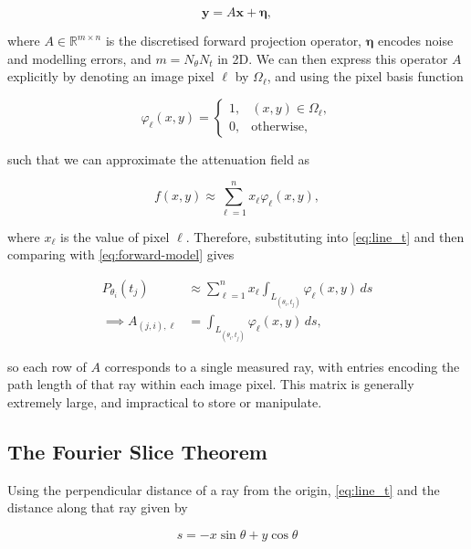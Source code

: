 \begin{equation}
\mathbf{y}=A\mathbf{x}+\boldsymbol{\eta},
\label{eq:forward-model}
\end{equation}

where $A\in \mathbb{R}^{m \times n}$ is the discretised forward projection operator, $\boldsymbol{\eta}$ encodes noise and modelling errors, and $m=N_\theta N_t$ in 2D. We can then express this operator $A$ explicitly by denoting an image pixel $\ell$ by $\Omega_\ell$, and using the pixel basis function

\begin{equation}
\varphi_\ell(x,y)=  
\begin{cases}  
1, & (x,y)\in \Omega_\ell,\\ 
0, & \text{otherwise},  
\end{cases}
\label{eq:pixel_basis}
\end{equation}

such that we can approximate the attenuation field as 

\begin{equation}
f(x,y)\approx \sum_{\ell=1}^n x_\ell \varphi_\ell(x,y),
\label{eq:pixel_expansion}
\end{equation}

where $x_\ell$ is the value of pixel $\ell$. Therefore, substituting into \eqref{eq:line_t} and then comparing with \eqref{eq:forward-model} gives

\begin{align}
P_{\theta_i}(t_j)  
&\approx  
\sum_{\ell=1}^n x_\ell  
\int_{L_{(\theta_i,t_j)}} \varphi_\ell(x,y)\,ds\\
\implies A_{(j,i),\ell}&=\int_{L_{(\theta_i, t_j)}}\varphi_\ell(x,y)\, ds,
\label{eq:system_matrix_entries}
\end{align}

so each row of $A$ corresponds to a single measured ray, with entries encoding the path length of that ray within each image pixel. This matrix is generally extremely large, and impractical to store or manipulate.

\subsection{The Fourier Slice Theorem}
\label{subsec:fourier_slice_theorem}

Using the perpendicular distance of a ray from the origin, \eqref{eq:line_t} and the distance along that ray given by

\begin{equation}
s=-x\sin \theta+ y \cos\theta
\label{eq:ray_coordinate_s}
\end{equation}

